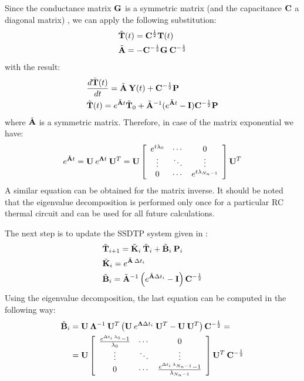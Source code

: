 Since the conductance matrix $\mathbf{\mathbf{G}}$ is a symmetric matrix (and the capacitance $\mathbf{\mathbf{C}}$ a diagonal matrix) \cite{rao2007}, we can apply the following substitution:
\begin{align*}
  & \tilde{\mathbf{T}}(t) = \mathbf{C}^{\frac{1}{2}} \mathbf{T}(t) \\
  & \tilde{\mathbf{A}} = -\mathbf{C}^{-\frac{1}{2}} \mathbf{G} \: \mathbf{C}^{-\frac{1}{2}}
\end{align*}
with the result:
\begin{align*}
  & \frac{d\tilde{\mathbf{T}}(t)}{dt} = \tilde{\mathbf{A}} \: \mathbf{Y}(t) + \mathbf{C}^{-\frac{1}{2}} \mathbf{P} \\
  & \tilde{\mathbf{T}}(t) = e^{\tilde{\mathbf{A}} t} \tilde{\mathbf{T}}_0 + \tilde{\mathbf{A}}^{-1} (e^{\tilde{\mathbf{A}} t} - \mathbf{I}) \mathbf{C}^{-\frac{1}{2}} \mathbf{P}
\end{align*}
where $\tilde{\mathbf{A}}$ is a symmetric matrix. Therefore, in case of the matrix exponential we have:
\[
  e^{\tilde{\mathbf{A}} t} = \mathbf{U} \: e^{\mathbf{\Lambda} t} \: \mathbf{U}^T = \mathbf{U} \left[
      \begin{array}{ccc}
        e^{t \lambda_0} & \cdots & 0 \\
        \vdots & \ddots & \vdots \\
        0 & \cdots & e^{t \lambda_{N_n - 1}}
      \end{array}
    \right] \mathbf{U}^T
\]
A similar equation can be obtained for the matrix inverse. It should be noted that the eigenvalue decomposition is performed only once for a particular RC thermal circuit and can be used for all future calculations.

The next step is to update the SSDTP system given in :
\begin{align}
  & \tilde{\mathbf{T}}_{i+1} = \tilde{\mathbf{K}}_i \: \tilde{\mathbf{T}}_i + \tilde{\mathbf{B}}_i \: \mathbf{P}_i \label{eq:recurrent-equation} \\
  & \tilde{\mathbf{K}}_i = e^{\tilde{\mathbf{A}} \: \Delta t_i} \nonumber \\
  & \tilde{\mathbf{B}}_i = \tilde{\mathbf{A}}^{-1} \left( e^{\tilde{\mathbf{A}} \Delta t_i} - \mathbf{I} \right) \mathbf{C}^{-\frac{1}{2}} \nonumber
\end{align}
Using the eigenvalue decomposition, the last equation can be computed in the following way:
\begin{align*}
  \tilde{\mathbf{B}}_i & = \mathbf{U} \: \mathbf{\Lambda}^{-1} \: \mathbf{U}^T \left(\mathbf{U} \: e^{\mathbf{\Lambda} \Delta t_i} \: \mathbf{U}^T - \mathbf{U} \: \mathbf{U}^T \right) \mathbf{C}^{-\frac{1}{2}} = \\
      & = \mathbf{U} \left[
        \begin{array}{ccc}
          \frac{e^{\Delta t_i \: \lambda_0} - 1}{\lambda_0} & \cdots & 0 \\
          \vdots & \ddots & \vdots \\
          0 & \cdots & \frac{e^{\Delta t_i \: \lambda_{N_n - 1}} - 1}{\lambda_{N_n - 1}}
        \end{array}
      \right] \mathbf{U}^T \: \mathbf{C}^{-\frac{1}{2}}
\end{align*}

